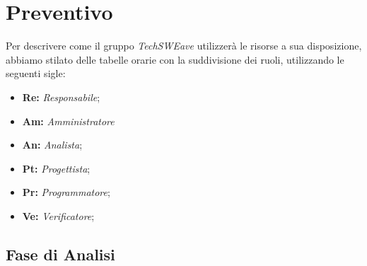 \section{Preventivo}
Per descrivere come il gruppo \emph{TechSWEave} utilizzerà le risorse a sua disposizione, abbiamo stilato delle tabelle orarie con la suddivisione dei ruoli, utilizzando le seguenti sigle:
\begin{itemize}
    \item \textbf{Re: }\emph{Responsabile};
    \item \textbf{Am: }\emph{Amministratore}
    \item \textbf{An: }\emph{Analista};
    \item \textbf{Pt: }\emph{Progettista};
    \item \textbf{Pr: }\emph{Programmatore};
    \item \textbf{Ve: }\emph{Verificatore};
\end{itemize}

\subsection{Fase di Analisi}

